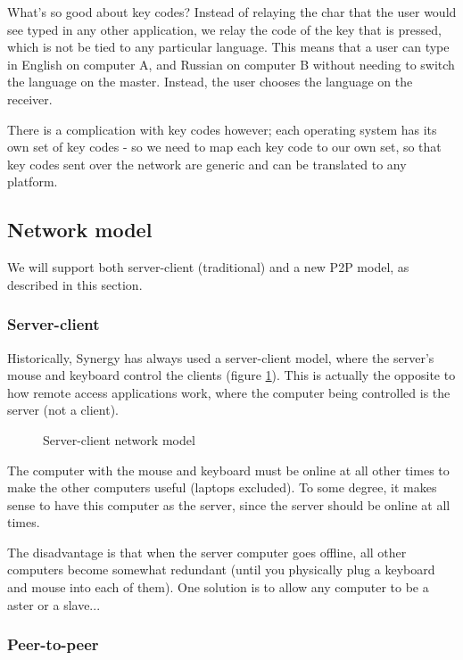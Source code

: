 What's so good about key codes? Instead of relaying the char that the user would
see typed in any other application, we relay the code of the key that is 
pressed, which is not be tied to any particular language. This means that a user
can type in English on computer A, and Russian on computer B without needing to
switch the language on the master. Instead, the user chooses the language on
the receiver.

There is a complication with key codes however; each operating system has its
own set of key codes - so we need to map each key code to our own set, so that
key codes sent over the network are generic and can be translated to any 
platform.

\subsection{Network model}

We will support both server-client (traditional) and a new P2P model, as
described in this section.

\subsubsection{Server-client}

Historically, Synergy has always used a server-client model, where the server's
mouse and keyboard control the clients (figure \ref{fig:serverClient}). This is
actually the opposite to how remote access applications work, where the computer
being controlled is the server (not a client).

\begin{figure}[ht!]
  \centering
  
  \caption{Server-client network model}
  \label{fig:serverClient}
\end{figure}

The computer with the mouse and keyboard must be online at all other times to
make the other computers useful (laptops excluded). To some degree, it makes 
sense to have this computer as the server, since the server should be online
at all times.

The disadvantage is that when the server computer goes offline, all other 
computers become somewhat redundant (until you physically plug a keyboard
and mouse into each of them). One solution is to allow any computer to be a 
aster or a slave...

\subsubsection{Peer-to-peer}

